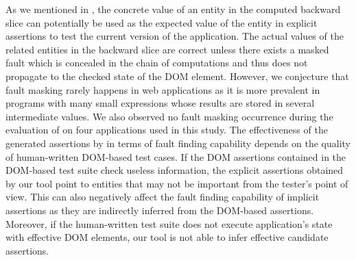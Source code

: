  As we mentioned in , the concrete value of an entity in the computed backward slice can potentially be used as the expected value of the entity in explicit assertions to test the current version of the application.
The actual values of the related entities in the backward slice are correct unless there exists a masked fault which is concealed in the chain of computations and thus does not propagate to the checked state of the DOM element. However, we conjecture that fault masking rarely happens in \javascript web applications as it is more prevalent in programs with many small expressions whose results are stored in several intermediate values. We also observed no fault masking occurrence during the evaluation of \atrina on four \javascript applications used in this study.
 The effectiveness of the generated assertions by \atrina in terms of fault finding capability depends on the quality of human-written DOM-based test cases. If the DOM assertions contained in the DOM-based test suite check useless information, the explicit assertions obtained by our tool point to entities that may not be important from the tester's point of view. This can also negatively affect the fault finding capability of implicit assertions as they are indirectly inferred from the DOM-based assertions. Moreover, if the human-written test suite does not execute application's state with effective DOM elements, our tool is not able to infer effective candidate assertions.   